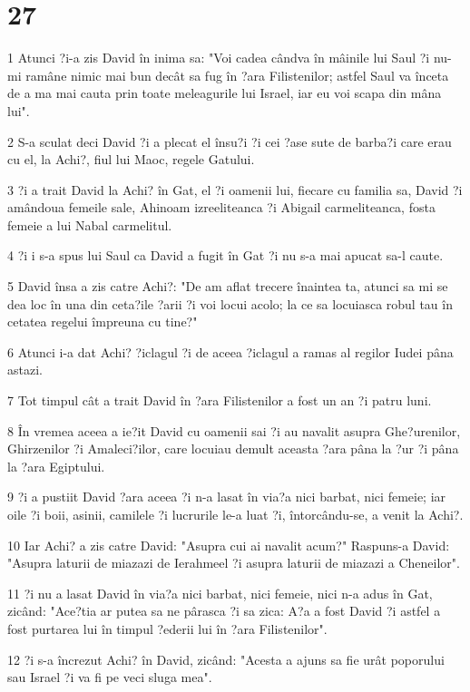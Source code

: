 \chapter{27}

\par 1 Atunci ?i-a zis David în inima sa: "Voi cadea cândva în mâinile lui Saul ?i nu-mi ramâne nimic mai bun decât sa fug în ?ara Filistenilor; astfel Saul va înceta de a ma mai cauta prin toate meleagurile lui Israel, iar eu voi scapa din mâna lui".
\par 2 S-a sculat deci David ?i a plecat el însu?i ?i cei ?ase sute de barba?i care erau cu el, la Achi?, fiul lui Maoc, regele Gatului.
\par 3 ?i a trait David la Achi? în Gat, el ?i oamenii lui, fiecare cu familia sa, David ?i amândoua femeile sale, Ahinoam izreeliteanca ?i Abigail carmeliteanca, fosta femeie a lui Nabal carmelitul.
\par 4 ?i i s-a spus lui Saul ca David a fugit în Gat ?i nu s-a mai apucat sa-l caute.
\par 5 David însa a zis catre Achi?: "De am aflat trecere înaintea ta, atunci sa mi se dea loc în una din ceta?ile ?arii ?i voi locui acolo; la ce sa locuiasca robul tau în cetatea regelui împreuna cu tine?"
\par 6 Atunci i-a dat Achi? ?iclagul ?i de aceea ?iclagul a ramas al regilor Iudei pâna astazi.
\par 7 Tot timpul cât a trait David în ?ara Filistenilor a fost un an ?i patru luni.
\par 8 În vremea aceea a ie?it David cu oamenii sai ?i au navalit asupra Ghe?urenilor, Ghirzenilor ?i Amaleci?ilor, care locuiau demult aceasta ?ara pâna la ?ur ?i pâna la ?ara Egiptului.
\par 9 ?i a pustiit David ?ara aceea ?i n-a lasat în via?a nici barbat, nici femeie; iar oile ?i boii, asinii, camilele ?i lucrurile le-a luat ?i, întorcându-se, a venit la Achi?.
\par 10 Iar Achi? a zis catre David: "Asupra cui ai navalit acum?" Raspuns-a David: "Asupra laturii de miazazi de Ierahmeel ?i asupra laturii de miazazi a Cheneilor".
\par 11 ?i nu a lasat David în via?a nici barbat, nici femeie, nici n-a adus în Gat, zicând: "Ace?tia ar putea sa ne pârasca ?i sa zica: A?a a fost David ?i astfel a fost purtarea lui în timpul ?ederii lui în ?ara Filistenilor".
\par 12 ?i s-a încrezut Achi? în David, zicând: "Acesta a ajuns sa fie urât poporului sau Israel ?i va fi pe veci sluga mea".

